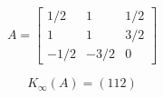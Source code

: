 \[
A=\left[
\begin{array}{ccc}
1/2 & 1 & 1/2 \\
1 & 1 & 3/2\\
-1/2 & -3/2 & 0
\end{array}\right]
\]
\bigskip

\[
  K_\infty (A)= \left(
  112 \right)
\]
